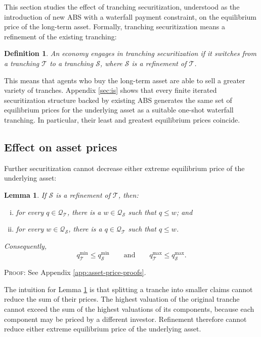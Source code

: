\documentclass[11pt]{article}
\theoremstyle{plain}
\newtheorem{lmm}{Lemma}%
\newtheorem{dfn}{Definition}%
\begin{document}
This section studies the effect of tranching securitization, understood as the introduction of new ABS with a waterfall payment constraint, on the equilibrium price of the long-term asset. Formally, tranching securitization means a refinement of the existing tranching:
\begin{dfn} \label{def:tranching-sec}
An economy engages in tranching securitization if it switches from a tranching $\mathcal{T}$ to a tranching  $\mathcal{S}$, where $\mathcal{S}$ is a refinement of $\mathcal{T}$.
\end{dfn}
This means that agents who buy the long-term asset are able to sell a greater variety of tranches. Appendix \ref{sec:is} shows that every finite iterated securitization structure backed by existing ABS generates the same set of equilibrium prices for the underlying asset as a suitable one-shot waterfall tranching. In particular, their least and greatest equilibrium prices coincide.

\subsection{Effect on asset prices}

Further securitization cannot decrease either extreme equilibrium price of the underlying asset:
\begin{lmm} \label{refine}
If $\mathcal{S}$ is a refinement of $\mathcal{T}$, then:
\begin{enumerate}[(i)]
\item for every $q\in\mathcal{Q}_{\mathcal{T}}$, there is a $w\in\mathcal{Q}_{\mathcal{S}}$ such that $q\leq w$; and
\item for every $w\in\mathcal{Q}_{\mathcal{S}}$, there is a $q\in\mathcal{Q}_{\mathcal{T}}$ such that $q\leq w$.
\end{enumerate}
Consequently,
\[
q_{\mathcal{T}}^{\min}\leq q_{\mathcal{S}}^{\min}
\qquad\text{and}\qquad
q_{\mathcal{T}}^{\max}\leq q_{\mathcal{S}}^{\max}.
\]
\end{lmm}
\textsc{Proof:} See Appendix \ref{app:asset-price-proofs}.

The intuition for Lemma \ref{refine} is that splitting a tranche into smaller claims cannot reduce the sum of their prices. The highest valuation of the original tranche cannot exceed the sum of the highest valuations of its components, because each component may be priced by a different investor. Refinement therefore cannot reduce either extreme equilibrium price of the underlying asset.
\end{document}
